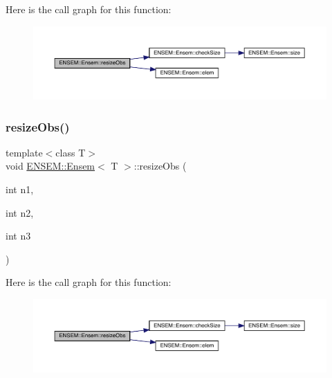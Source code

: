Here is the call graph for this function\+:
\nopagebreak
\begin{figure}[H]
\begin{center}
\leavevmode
\includegraphics[width=350pt]{d7/d3e/classENSEM_1_1Ensem_a8d63351cad23f2af13f26c7326d1abcf_cgraph}
\end{center}
\end{figure}
\mbox{\label{classENSEM_1_1Ensem_a8d63351cad23f2af13f26c7326d1abcf}} 
\subsubsection{\texorpdfstring{resizeObs()}{resizeObs()}\hspace{0.1cm}{\footnotesize\ttfamily [9/12]}}
{\footnotesize\ttfamily template$<$class T$>$ \\
void \mbox{\hyperlink{classENSEM_1_1Ensem}{E\+N\+S\+E\+M\+::\+Ensem}}$<$ T $>$\+::resize\+Obs (\begin{DoxyParamCaption}\item[{int}]{n1,  }\item[{int}]{n2,  }\item[{int}]{n3 }\end{DoxyParamCaption})\hspace{0.3cm}{\ttfamily [inline]}}

Here is the call graph for this function\+:
\nopagebreak
\begin{figure}[H]
\begin{center}
\leavevmode
\includegraphics[width=350pt]{d7/d3e/classENSEM_1_1Ensem_a8d63351cad23f2af13f26c7326d1abcf_cgraph}
\end{center}
\end{figure}
\mbox{\label{classENSEM_1_1Ensem_a4acf05018e5c49c0053dbe8cf76a4252}} 
